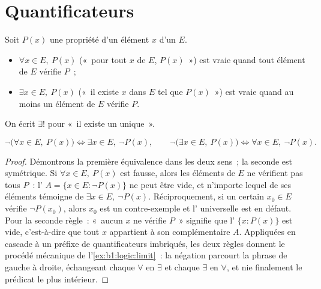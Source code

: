 \section{Quantificateurs}

\begin{definition}[Quantificateurs]\label{def:b1:logic:quantifiers}
Soit $P(x)$ une propriété d'un élément $x$ d'un  $E$.
\begin{itemize}
  \item $\forall x \in E,\ P(x)$ («~pour tout $x$ de $E$, $P(x)$~») est
        vraie quand tout élément de $E$ vérifie $P$~;
  \item $\exists x \in E,\ P(x)$ («~il existe $x$ dans $E$ tel que
        $P(x)$~») est vraie quand au moins un élément de $E$ vérifie
        $P$.
\end{itemize}
On écrit $\exists!$ pour «~il existe un unique~».
\end{definition}

\begin{proposition}\label{prop:b1:logic:negquant}
\[
\lnot\bigl(\forall x \in E,\ P(x)\bigr) \iff
\exists x \in E,\ \lnot P(x),
\qquad
\lnot\bigl(\exists x \in E,\ P(x)\bigr) \iff
\forall x \in E,\ \lnot P(x).
\]
\end{proposition}

\begin{proof}
Démontrons la première équivalence dans les deux sens~; la seconde
est symétrique. Si $\forall x \in E,\ P(x)$ est fausse, alors les
éléments de $E$ ne vérifient pas tous $P$~: l'
$A = \{x \in E : \lnot P(x)\}$ ne peut être vide, et n'importe lequel
de ses éléments témoigne de
$\exists x \in E,\ \lnot P(x)$. Réciproquement, si un certain $x_0 \in
E$ vérifie $\lnot P(x_0)$, alors $x_0$ est un contre-exemple et
l' universelle est en défaut. Pour la seconde règle~: «~aucun
$x$ ne vérifie $P$~» signifie que l' $\{x : P(x)\}$ est vide,
c'est-à-dire que tout $x$ appartient à son complémentaire $A$.
Appliquées en cascade à un préfixe de quantificateurs imbriqués, les
deux règles donnent le procédé mécanique de l'\cref{ex:b1:logic:limit}~:
la négation parcourt la phrase de gauche à droite, échangeant chaque
$\forall$ en $\exists$ et chaque $\exists$ en $\forall$, et nie
finalement le prédicat le plus intérieur.
\end{proof}

